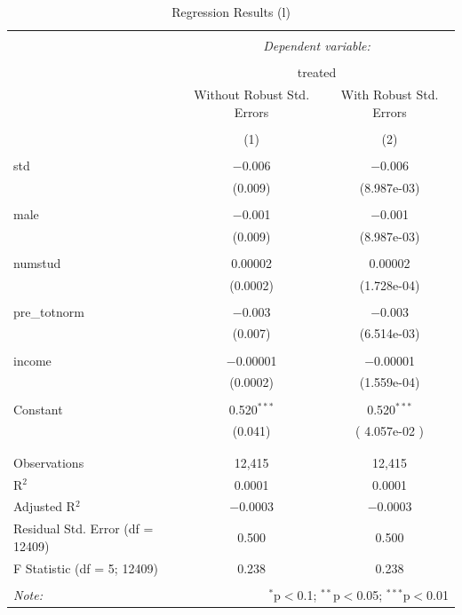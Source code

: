 \documentclass[
  12pt,
  landscape]{article}
\begin{document}
\begin{table}[H] \centering 
  \caption{Regression Results (l)} 
  \label{} 
\begin{tabular}{@{\extracolsep{5pt}}lcc} 
\\[-1.8ex]\hline 
\hline \\[-1.8ex] 
 & \multicolumn{2}{c}{\textit{Dependent variable:}} \\ 
\cline{2-3} 
\\[-1.8ex] & \multicolumn{2}{c}{treated} \\ 
 & Without Robust Std. Errors & With Robust Std. Errors \\ 
\\[-1.8ex] & (1) & (2)\\ 
\hline \\[-1.8ex] 
 std & $-$0.006 & $-$0.006 \\ 
  & (0.009) & (8.987e-03) \\ 
  & & \\ 
 male & $-$0.001 & $-$0.001 \\ 
  & (0.009) & (8.987e-03) \\ 
  & & \\ 
 numstud & 0.00002 & 0.00002 \\ 
  & (0.0002) & (1.728e-04) \\ 
  & & \\ 
 pre\_totnorm & $-$0.003 & $-$0.003 \\ 
  & (0.007) & (6.514e-03) \\ 
  & & \\ 
 income & $-$0.00001 & $-$0.00001 \\ 
  & (0.0002) & (1.559e-04) \\ 
  & & \\ 
 Constant & 0.520$^{***}$ & 0.520$^{***}$ \\ 
  & (0.041) & ( 4.057e-02 ) \\ 
  & & \\ 
\hline \\[-1.8ex] 
Observations & 12,415 & 12,415 \\ 
R$^{2}$ & 0.0001 & 0.0001 \\ 
Adjusted R$^{2}$ & $-$0.0003 & $-$0.0003 \\ 
Residual Std. Error (df = 12409) & 0.500 & 0.500 \\ 
F Statistic (df = 5; 12409) & 0.238 & 0.238 \\ 
\hline 
\hline \\[-1.8ex] 
\textit{Note:}  & \multicolumn{2}{r}{$^{*}$p$<$0.1; $^{**}$p$<$0.05; $^{***}$p$<$0.01} \\ 
\end{tabular} 
\end{table}
\end{document}

